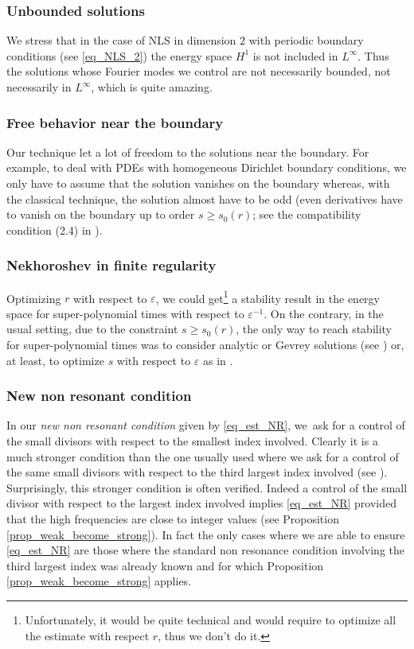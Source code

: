 \subsubsection*{Unbounded solutions}
We stress that in the case of NLS in dimension $2$ with periodic boundary conditions (see \eqref{eq_NLS_2}) the energy space $H^1$ is not included in $L^\infty$. Thus the solutions whose Fourier modes we control are not necessarily bounded, \ie not necessarily in $L^\infty$, which is quite amazing.

\subsubsection*{Free behavior near the boundary}
Our technique let a lot of freedom to the solutions near the boundary. For example, to deal with PDEs with homogeneous Dirichlet boundary conditions, we only have to assume that the solution vanishes on the boundary whereas, with the classical technique, the solution almost have to be odd (\ie even derivatives have to vanish on the boundary up to order $s\geq s_0(r)$; see \eg the compatibility condition (2.4) in \cite{Bam03}).

\subsubsection*{Nekhoroshev in finite regularity}
Optimizing $r$ with respect to $\varepsilon$, we could get\footnote{Unfortunately, it would be quite technical and would require to optimize all the estimate with respect $r$, thus we don't do it.} a stability result in the energy space for super-polynomial times with respect to $\varepsilon^{-1}$. On the contrary, in the usual setting, due to the constraint $s\geq s_0(r)$, the only way to reach stability for super-polynomial times was to consider analytic or Gevrey solutions (see \cite{FG13,BMP20}) or, at least, to optimize $s$ with respect to $\varepsilon$ as in \cite{BMP20}.

\subsubsection*{New non resonant condition}
In our {\it new non resonant condition} given by \eqref{eq_est_NR}, we~ask for a control of the small divisors with respect to the smallest index involved. Clearly it is a much stronger condition than the one usually used where we ask for a control of the same small divisors with respect to the third largest index involved (see \cite{BG06}). Surprisingly, this stronger condition is often verified. Indeed a control of the small divisor with respect to the largest index involved implies \eqref{eq_est_NR} provided that the high frequencies are close to integer values (see Proposition \ref{prop_weak_become_strong}). In fact the only cases where we are able to ensure \eqref{eq_est_NR} are those where the standard non resonance condition involving the third largest index was already known and for which Proposition \ref{prop_weak_become_strong} applies.

